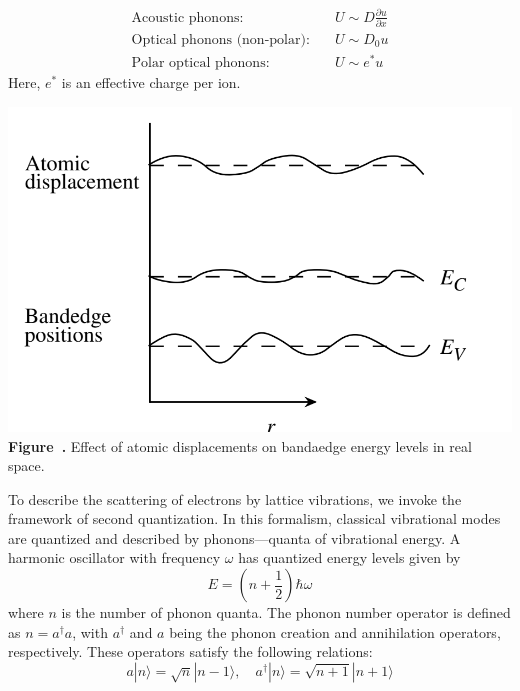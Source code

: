 \begin{align*}
	\text{Acoustic phonons:} \quad            & U \sim D \frac{\partial u}{\partial x} \\
	\text{Optical phonons (non-polar):} \quad & U \sim D_0 u                           \\
	\text{Polar optical phonons:} \quad       & U \sim e^* u
\end{align*}
Here, $e^*$ is an effective charge per ion.\\
\begin{center}
	\begin{minipage}{0.5\textwidth}
		\centering
		\includegraphics[width=\textwidth]{img/AtomicDisplacements.png}
		\\[0.5em]
		\textbf{Figure~\thefigure.} Effect of atomic displacements on bandaedge energy levels in real space.
		\label{fig:AtomicDisplacements}
	\end{minipage}
\end{center}
To describe the scattering of electrons by lattice vibrations, we invoke the framework of second quantization. In this formalism, classical vibrational modes are quantized and described by phonons—quanta of vibrational energy. A harmonic oscillator with frequency $\omega$ has quantized energy levels given by
\begin{equation}
	E = \left( n + \frac{1}{2} \right) \hbar \omega
\end{equation}
where $n$ is the number of phonon quanta. The phonon number operator is defined as $n = a^\dagger a$, with $a^\dagger$ and $a$ being the phonon creation and annihilation operators, respectively. These operators satisfy the following relations:
\begin{equation}
	a |n\rangle = \sqrt{n} |n-1\rangle, \quad a^\dagger |n\rangle = \sqrt{n+1} |n+1\rangle
\end{equation}
